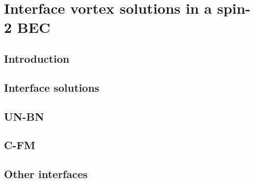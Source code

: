 \chapter{Interface vortex solutions in a spin-2 BEC}

\section{Introduction}

\section{Interface solutions}

\section{UN-BN}

\section{C-FM}

\section{Other interfaces}

